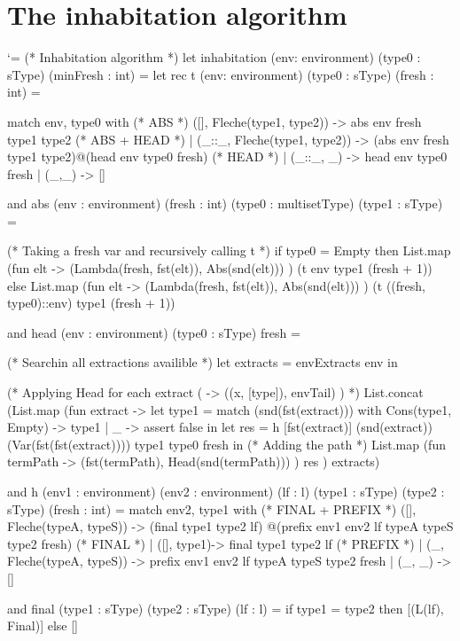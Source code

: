 \documentclass{article}
\let\origlstlisting=\lstlisting
\let\endoriglstlisting=\endlstlisting
\renewenvironment{lstlisting}
{\mathcode`\-=\hyphenmathcode
    \everymath{}\mathsurround=0pt\origlstlisting}
{\endoriglstlisting}
\begin{document}
\section{The inhabitation algorithm}
\begin{lstlisting}
(* Inhabitation algorithm *)
let inhabitation (env: environment) (type0 : sType) (minFresh : int)  =
  let rec t (env: environment) (type0 : sType) (fresh : int) =

    match env, type0 with
      (* ABS *)
      ([], Fleche(type1, type2)) -> abs env fresh type1 type2
      (* ABS + HEAD *)
    | (_::_, Fleche(type1, type2)) -> (abs env fresh type1 type2)@(head env type0 fresh)
      (* HEAD *)
    | (_::_, _) -> head env type0 fresh
    | (_,_) -> []


  and abs (env : environment) (fresh : int) (type0 : multisetType) (type1 : sType) = 

    (* Taking a fresh var and recursively calling t *)
    if type0 = Empty then
      List.map (fun elt -> (Lambda(fresh, fst(elt)), Abs(snd(elt))) ) 
          (t env type1 (fresh + 1))
    else
      List.map (fun elt -> (Lambda(fresh, fst(elt)), Abs(snd(elt))) ) 
          (t ((fresh, type0)::env) type1 (fresh + 1))

  and head (env : environment) (type0 : sType) fresh = 

    (* Searchin all extractions availible *)
    let extracts = envExtracts env in

    (* Applying Head for each extract ( ->  ((x, [type]), envTail) ) *)
    List.concat 
      (List.map 
	 (fun extract -> let type1 = match (snd(fst(extract))) with
                            	   Cons(type1, Empty) -> type1
                            	 | _ -> assert false 
	  in
	    let res = h [fst(extract)] (snd(extract)) 
	                    (Var(fst(fst(extract)))) type1 type0 fresh in
        (* Adding the path *)
	     List.map (fun termPath -> (fst(termPath), Head(snd(termPath))) ) res
	 ) 
	 extracts)
    
  and h (env1 : environment) (env2 : environment) (lf : l) (type1 : sType) 
          (type2 : sType) (fresh : int) =
    match env2, type1 with
    (* FINAL + PREFIX *)
      ([], Fleche(typeA, typeS)) -> (final type1 type2 lf)
                                      @(prefix env1 env2 lf typeA typeS type2 fresh)
    (* FINAL *)
    | ([], type1)-> final type1 type2 lf
    (* PREFIX *)
    | (_, Fleche(typeA, typeS)) -> prefix env1 env2 lf typeA typeS type2 fresh
    | (_, _) -> []

  and final (type1 : sType) (type2 : sType) (lf : l) =
    if type1 = type2  then [(L(lf), Final)] else []


\end{lstlisting}
\end{document}
